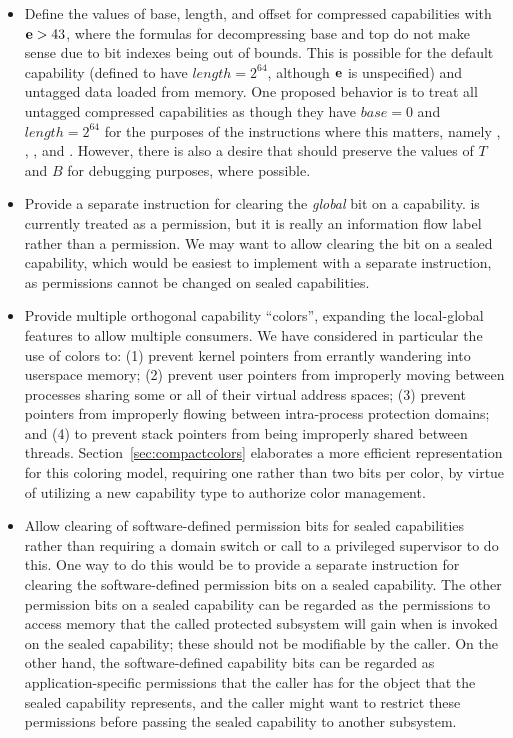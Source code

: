 \begin{itemize}
\item
  Define the values of base, length, and offset for compressed
  capabilities with ${\bf e}{} > 43$, where the formulas for
  decompressing base and top do not make sense due to bit indexes
  being out of bounds.  This is possible for the default capability
  (defined to have $length = 2^{64}$, although ${\bf e}{}$ is
  unspecified) and untagged data loaded from memory. One proposed
  behavior is to treat all untagged compressed capabilities as though
  they have $base=0$ and $length=2^{64}$ for the purposes of the
  instructions where this matters, namely ,
  , ,
  and .
  However, there is also a desire that  should preserve
    the values of $T$ and $B$ for debugging purposes, where possible.

\item
  Provide a separate instruction for clearing the \emph{global} bit on a
  capability.  \cappermG is currently treated as a permission, but it is
  really an information flow label rather than a permission. We may want to
  allow clearing the \cappermG bit on a sealed capability, which would
  be easiest to implement with a separate instruction, as permissions cannot
  be changed on sealed capabilities.

\item
  Provide multiple orthogonal capability ``colors'', expanding the
  local-global features to allow multiple consumers.
  We have considered in particular the use of colors to: (1) prevent kernel
  pointers from errantly wandering into userspace memory; (2) prevent user
  pointers from improperly moving between processes sharing some or all of
  their virtual address spaces; (3) prevent pointers from improperly flowing
  between intra-process protection domains; and (4) to prevent stack pointers
  from being improperly shared between threads.
  Section~\ref{sec:compactcolors} elaborates a more efficient representation
  for this coloring model, requiring one rather than two bits per color, by
  virtue of utilizing a new capability type to authorize color management.

\item
  Allow clearing of software-defined permission bits for sealed
  capabilities rather than requiring a domain switch or call to a privileged
  supervisor to do this.
  One way to do this would be to provide a separate instruction for clearing
  the software-defined permission bits
  on a sealed capability. The other permission bits on a sealed capability
  can be regarded as the permissions to access memory that the called protected
  subsystem will gain when  is invoked on the sealed
  capability; these should not be modifiable by the caller. On the other hand,
  the software-defined capability bits can be regarded as application-specific
  permissions that the caller has for the object that the sealed capability
  represents, and the caller might want to restrict these permissions before
  passing the sealed capability to another subsystem.


\end{itemize}
